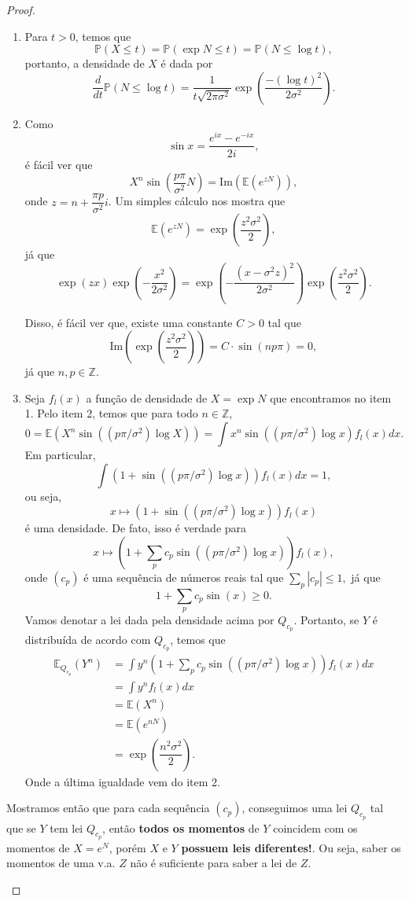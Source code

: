 \documentclass[12pt,a4paper,oneside]{book}
\theoremstyle{definition}
\theoremstyle{remark}
\numberwithin{equation}{section}
\newcommand{\E}{\mathbb{E}}
\newcommand{\pr}{\mathbb{P}}
\begin{document}
\begin{proof}
$ $
\begin{enumerate}
\item Para $t>0$, temos que
$$\pr(X\leq t) = \pr(\exp N \leq t) = \pr(N\leq \log t), $$
portanto, a densidade de $X$ é dada por
$$\dfrac{d}{dt}\pr(N\leq \log t) = \dfrac{1}{t\sqrt{2\pi \sigma^2}}\exp\left(\dfrac{-(\log t)^2}{ 2\sigma^2}\right)  . $$

\item  Como $$\sin x = \dfrac{e^{ix} - e^{-ix}}{2i}, $$
é fácil ver que 
$$X^n \sin \left( \dfrac{p\pi}{\sigma^2}N\right)  = \textrm{Im}\left(\E(e^{zN}) \right), $$
onde $z = n+\dfrac{\pi p }{\sigma^2} i$. Um simples cálculo nos mostra que
$$\E(e^{zN}) =\exp \left(\dfrac{z^2\sigma^2}{2}\right), $$
já que
$$\exp(zx)\exp\left(-\dfrac{x^2}{2\sigma^2}\right) =\exp\left(-\dfrac{(x-\sigma^2z)^2}{2\sigma^2} \right)\exp \left(\dfrac{z^2\sigma^2}{2}\right).$$


Disso, é fácil ver que, existe uma constante $C>0$ tal que
$$\textrm{Im}\left(\exp \left(\dfrac{z^2\sigma^2}{2}\right)\right) =  C\cdot \sin(np\pi) = 0, $$
já que $n,p\in \mathbb{Z}.$

\item  Seja $f_l(x)$ a função de densidade de $X=\exp N$ que encontramos no item 1.
Pelo item 2, temos que para todo $n\in\mathbb{Z}$,
$$0 = \E(X^n\sin((p\pi/\sigma^2)\log X ))= \int x^n \sin((p\pi/\sigma^2)\log x)f_l(x)dx. $$
Em particular,
$$\int (1+ \sin((p\pi/\sigma^2)\log x))f_l(x)dx =1,$$
ou seja,
$$x\mapsto (1+ \sin((p\pi/\sigma^2)\log x))f_l(x)$$
é uma densidade. De fato, isso é verdade para
$$x\mapsto (1+ \sum_p c_p\sin((p\pi/\sigma^2)\log x))f_l(x),$$
onde $(c_p)$ é uma sequência de números reais tal que $\sum_p |c_p| \leq 1,$ já que
$$1+\sum_p c_p \sin (x)\geq 0.  $$ 
Vamos denotar a lei dada pela densidade acima por $Q_{c_p}.$ Portanto, se $Y$ é distribuída de acordo com $Q_{c_p}$, temos que
\begin{align*}
\E_{Q_{c_p}}(Y^n) &= \int y^n(1+ \sum_p c_p\sin((p\pi/\sigma^2)\log x))f_l(x)dx  \\
& = \int y^n f_l(x)dx\\
& = \E(X^n)\\
& = \E(e^{nN})\\ 
& = \exp\left(\dfrac{n^2\sigma^2}{2} \right).
\end{align*}
Onde a última igualdade vem do item 2.
\end{enumerate}

\begin{tcolorbox}[colback = yellow!60]
Mostramos então que para cada sequência  $(c_p)$, conseguimos uma lei $Q_{c_p}$ tal que se $Y$ tem lei $Q_{c_p}$, então \textbf{todos os momentos}  de $Y$ coincidem com os momentos de $X=e^N$, porém $X$ e $Y$ \textbf{possuem leis diferentes!}. Ou seja, saber os momentos de uma v.a. $Z$ não é suficiente para saber a lei de $Z$.    
\end{tcolorbox}



\end{proof}
\end{document}
